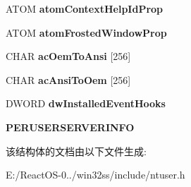 \begin{DoxyCompactItemize}
A\+T\+OM {\bfseries atom\+Context\+Help\+Id\+Prop}
\item 
\mbox{\label{structtag_s_e_r_v_e_r_i_n_f_o_a6f3ded33b31d893ecba00f3c49061ca5}} 
A\+T\+OM {\bfseries atom\+Frosted\+Window\+Prop}
\item 
\mbox{\label{structtag_s_e_r_v_e_r_i_n_f_o_a231c521271619837a5ffeddf9e1237a8}} 
C\+H\+AR {\bfseries ac\+Oem\+To\+Ansi} \mbox{[}256\mbox{]}
\item 
\mbox{\label{structtag_s_e_r_v_e_r_i_n_f_o_a3de38140f27e00353c9840bf032c3898}} 
C\+H\+AR {\bfseries ac\+Ansi\+To\+Oem} \mbox{[}256\mbox{]}
\item 
\mbox{\label{structtag_s_e_r_v_e_r_i_n_f_o_a66c7dc53bbe8b83afb606bee7731169b}} 
D\+W\+O\+RD {\bfseries dw\+Installed\+Event\+Hooks}
\item 
\mbox{\label{structtag_s_e_r_v_e_r_i_n_f_o_a79b2b2052e1f6cf14887863cc95321ed}} 
{\bfseries P\+E\+R\+U\+S\+E\+R\+S\+E\+R\+V\+E\+R\+I\+N\+FO}
\end{DoxyCompactItemize}


该结构体的文档由以下文件生成\+:\begin{DoxyCompactItemize}
\item 
E\+:/\+React\+O\+S-\/0../win32ss/include/ntuser.\+h\end{DoxyCompactItemize}
